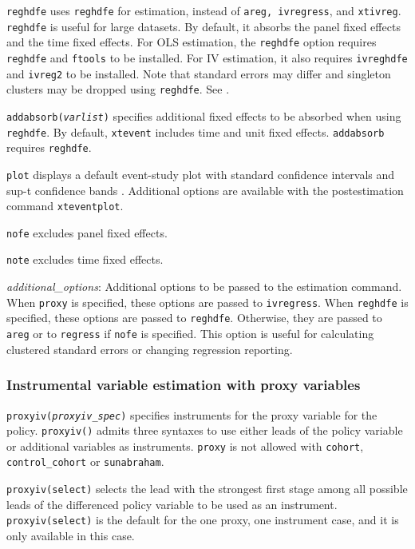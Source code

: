 \documentclass[12pt]{article}
\begin{document}
\hangpara
{\tt reghdfe} uses {\tt reghdfe} for estimation, instead of {\tt areg, ivregress}, and {\tt xtivreg}.
{\tt reghdfe} is useful for large datasets.
By default, it absorbs the panel fixed effects and the time fixed effects.
For OLS estimation, the {\tt reghdfe} option requires {\tt reghdfe} and {\tt ftools} to be installed. For IV estimation, it also requires {\tt ivreghdfe} and {\tt ivreg2} to be installed.
Note that standard errors may differ and singleton clusters may be dropped using {\tt reghdfe}.
See \citet{Correia2017:HDFE}.

\hangpara
{\tt addabsorb({\it varlist})} specifies additional fixed effects to be absorbed when using {\tt reghdfe}.
By default, {\tt xtevent} includes time and unit fixed effects.
{\tt addabsorb} requires {\tt reghdfe}.

\hangpara
{\tt plot} displays a default event-study plot with standard confidence intervals and sup-t confidence bands \mbox{\citep{montiel2019simultaneous}}.
Additional options are available with the postestimation command {\tt xteventplot}.

\hangpara
{\tt nofe} excludes panel fixed effects.

\hangpara
{\tt note} excludes time fixed effects.

\hangpara
{\it additional\_options}: Additional options to be passed to the estimation command.
When {\tt proxy} is specified, these options are passed to {\tt ivregress}.
When {\tt reghdfe} is specified, these options are passed to {\tt reghdfe}.
Otherwise, they are passed to {\tt areg} or to {\tt regress} if {\tt nofe} is specified.
This option is useful for calculating clustered standard errors or changing regression reporting.

\subsubsection{Instrumental variable estimation with proxy variables \citep{freyaldenhoven2021visualizationforth}}

\hangpara
{\tt proxyiv({\it proxyiv\_spec})} specifies instruments for the proxy variable for the policy.
{\tt proxyiv()} admits three syntaxes to use either leads of the policy variable or additional variables as instruments.
{\tt proxy} is not allowed with {\tt cohort},
{\tt control\_cohort} or {\tt sunabraham}.

\morehangpara
{\tt proxyiv(select)} selects the lead with the strongest first stage among all possible leads of the differenced policy variable to be used as an instrument.
{\tt proxyiv(select)} is the default for the one proxy, one instrument case, and it is only available in this case.
\end{document}
